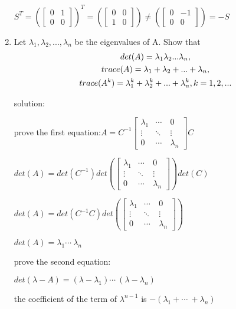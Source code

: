 \documentclass{article}
\begin{document}
\begin{enumerate}
		$S^T=(\begin{bmatrix} 0&1\\0&0 \end{bmatrix})^T
		=(\begin{bmatrix} 0&0\\1&0 \end{bmatrix})\neq
		(\begin{bmatrix} 0&-1\\0&0 \end{bmatrix})=-S$
		
		\item%
		Let $\lambda_1, \lambda_2, ..., \lambda_n$ be the eigenvalues of A. Show that
		\begin{gather}
			\setcounter{equation}{0}
			det(A)=\lambda_1\lambda_2...\lambda_n,\\
			trace(A)=\lambda_1+\lambda_2+...+\lambda_n,\\
			trace(A^k)=\lambda_1^k + \lambda_2^k + ... + \lambda_n^k, k=1,2,...
		\end{gather}
	
	    solution:$ $
	    
	    prove the first equation:$A=C^{-1}
	    \begin{bmatrix} \lambda _1 & \cdots\ &0\\
	    	\vdots &\ddots &\vdots \\
	    	0& \cdots\ &\lambda _n \end{bmatrix}
	    C$
	    
	    $det(A)=det(C^{-1})
	    det(\begin{bmatrix} \lambda _1 & \cdots\ &0\\
	    	\vdots &\ddots &\vdots \\
	    	0& \cdots\ &\lambda _n \end{bmatrix})
	    det(C)$
	    
	    $det(A)=det(C^{-1}C)
	    det(\begin{bmatrix} \lambda _1 & \cdots\ &0\\
	    	\vdots &\ddots &\vdots \\
	    	0& \cdots\ &\lambda _n \end{bmatrix})$
    	
    	$det(A)= \lambda _1  \cdots\  \lambda _n $
    	
    	\[\]prove the second equation:$ $
    	
    	$det(\lambda -A)=(\lambda -\lambda_1)\cdots\ (\lambda -\lambda_n)$
    	
    	the coefficient of the term of $\lambda^{n-1}$ is $-(\lambda_1+\cdots\ +\lambda_n)$
    	

\end{enumerate}
\end{document}
